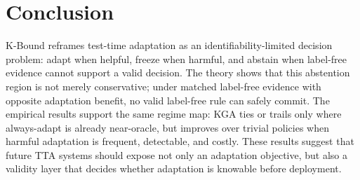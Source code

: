 \documentclass[11pt]{article}
\theoremstyle{plain}
\theoremstyle{definition}
\theoremstyle{remark}
\begin{document}
\section{Conclusion}
K-Bound reframes test-time adaptation as an identifiability-limited decision problem: adapt
when helpful, freeze when harmful, and abstain when label-free evidence cannot support a valid
decision. The theory shows that this abstention region is not merely conservative; under matched
label-free evidence with opposite adaptation benefit, no valid label-free rule can safely commit.
The empirical results support the same regime map: \textsc{KGA} ties or trails only where
always-adapt is already near-oracle, but improves over trivial policies when harmful adaptation
is frequent, detectable, and costly. These results suggest that future TTA systems should expose
not only an adaptation objective, but also a validity layer that decides whether adaptation is
knowable before deployment.

\appendix



\end{document}

